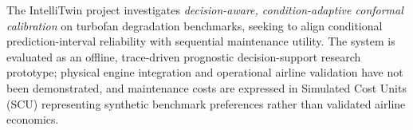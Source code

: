 The IntelliTwin project investigates \textit{decision-aware, condition-adaptive conformal calibration} on turbofan degradation benchmarks, seeking to align conditional prediction-interval reliability with sequential maintenance utility. The system is evaluated as an offline, trace-driven prognostic decision-support research prototype; physical engine integration and operational airline validation have not been demonstrated, and maintenance costs are expressed in Simulated Cost Units (SCU) representing synthetic benchmark preferences rather than validated airline economics.
